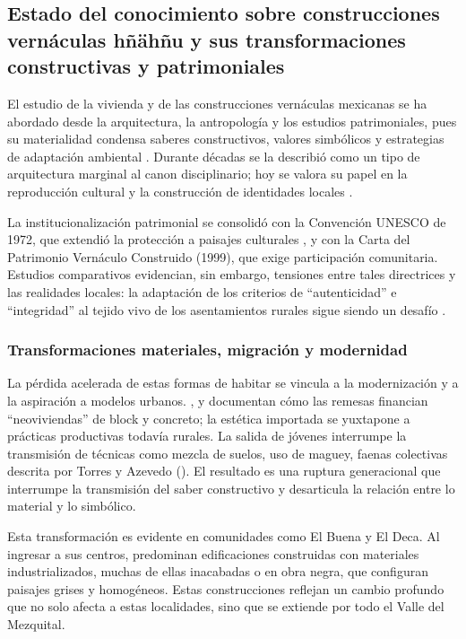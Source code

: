 \subsection{Estado del conocimiento sobre construcciones vernáculas hñähñu y sus transformaciones constructivas y patrimoniales}

El estudio de la vivienda y de las construcciones vernáculas mexicanas se ha abordado desde la arquitectura, la antropología y los estudios patrimoniales, pues su materialidad condensa saberes constructivos, valores simbólicos y estrategias de adaptación ambiental \cite{rudofsky1964, zarate2009arquitectura}.  Durante décadas se la describió como un tipo de arquitectura marginal al canon disciplinario; hoy se valora su papel en la reproducción cultural y la construcción de identidades locales \cite{gonzalez2017arquitectura, icomos1999carta}.

La institucionalización patrimonial se consolidó con la Convención UNESCO de 1972, que extendió la protección a paisajes culturales \cite{UNESCO1972}, y con la Carta del Patrimonio Vernáculo Construido (1999), que exige participación comunitaria.  Estudios comparativos evidencian, sin embargo, tensiones entre tales directrices y las realidades locales: la adaptación de los criterios de ``autenticidad'' e ``integridad'' al tejido vivo de los asentamientos rurales sigue siendo un desafío \cite{venecia1964card, icomos1999carta, prats1998concepto}.

\subsubsection{Transformaciones materiales, migración y modernidad}

La pérdida acelerada de estas formas de habitar se vincula a la modernización y a la aspiración a modelos urbanos. \cite{alvarez2003maguey}, \cite{juarez2018transformacion} y \cite{boils2010remesas} documentan cómo las remesas financian ``neoviviendas'' de block y concreto; la estética importada se yuxtapone a prácticas productivas todavía rurales.  La salida de jóvenes interrumpe la transmisión de técnicas como mezcla de suelos, uso de maguey, faenas colectivas descrita por Torres y Azevedo (\citeyear{torres2021transmision}).  El resultado es una ruptura generacional que interrumpe la transmisión del saber constructivo y desarticula la relación entre lo material y lo simbólico.

Esta transformación es evidente en comunidades como El Buena y El Deca. Al ingresar a sus centros, predominan edificaciones construidas con materiales industrializados, muchas de ellas inacabadas o en obra negra, que configuran paisajes grises y homogéneos. Estas construcciones reflejan un cambio profundo que no solo afecta a estas localidades, sino que se extiende por todo el Valle del Mezquital.

